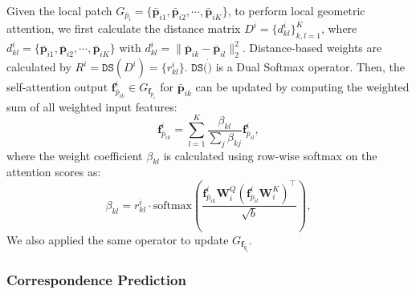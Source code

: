 Given the local patch $G_{\bar{p}_i}=\{\bar{\bm{p}}_{i1},\bar{\bm{p}}_{i2}, \cdots,\bar{\bm{p}}_{iK}\}$, 
to perform local geometric attention, we first calculate the distance matrix $D^i=\{d^i_{kl}\}_{k,l=1}^K$, 
where $d^i_{kl}=\{\bar{\bm{p}}_{i1},\bar{\bm{p}}_{i2}, \cdots, \bar{\bm{p}}_{iK}\}$ with $d^i_{kl}=\|\bar{\bm{p}}_{ik}-\bar{\bm{p}}_{il}\|^2_2$.
Distance-based weights are calculated by $R^i=\mathtt{DS}(D^i)=\{r^i_{kl}\}$. $\mathtt{DS}(\dot)$ is a Dual Softmax operator.
Then, the self-attention output $\bm{\bm{f}}^i_{\bar{p}_{ik}}\in G_{\bm{f}_{\bar{p}_i}}$ for $\bm{\bar{p}}_{ik}$ can be updated by computing the weighted sum of all weighted input features:
\vspace{-0.2cm}
\begin{equation}
    \bm{f}^i_{\bar{p}_{ik}} = \sum_{l=1}^{K}\frac{\beta_{kl}}{\sum_j\beta_{kj}}\bm{f}^i_{\bar{p}_{il}},
\end{equation}
where the weight coefficient $\beta_{kl}$ is calculated using row-wise softmax on the attention scores as:
\begin{equation}
    \beta_{kl} = r_{kl}^i\cdot\mbox{softmax} \left(  \frac{\bm{f}^i_{\bar{p}_{ik}}\bm{W}_i^Q(\bm{f}^i_{\bar{p}_{il}}\bm{W}_i^K)^\top}{\sqrt{b}}\right),
\end{equation}
We also applied the same operator to update $G_{\bm{f}_{\bar{q}_i}}$.

\subsubsection{Correspondence Prediction}


